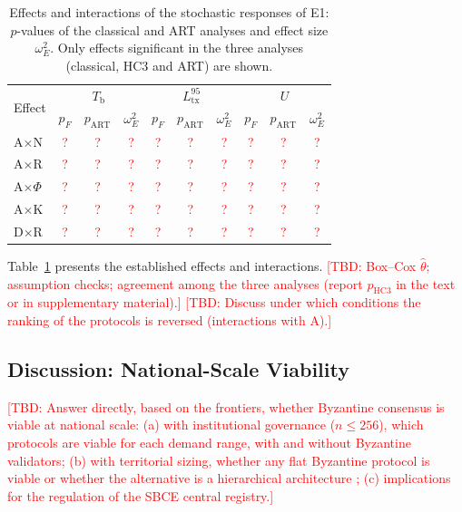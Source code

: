 \documentclass[english]{sbc2025}%
\newcommand{\tbd}[1]{\textcolor{red}{[TBD: #1]}}
\newcommand{\Tb}{T_{\mathrm{b}}}
\newcommand{\Lt}{L^{95}_{\mathrm{tx}}}
\newcommand{\Ut}{U}
\newcommand{\tbdc}{\textcolor{red}{?}} %
\begin{document}
\begin{table}[!ht]
\caption{Effects and interactions of the stochastic responses of E1: $p$-values of the classical and ART analyses and effect size $\omega^{2}_{E}$. Only effects significant in the three analyses (classical, HC3 and ART) are shown.}
\label{tab:anova}
\centering
\small
\begin{tabular}{@{}lccccccccc@{}}
\hline\hline
\multirow{2}{*}{Effect} & \multicolumn{3}{c}{$\Tb$} & \multicolumn{3}{c}{$\Lt$} & \multicolumn{3}{c}{$\Ut$} \\
 & $p_{F}$ & $p_{\mathrm{ART}}$ & $\omega^{2}_{E}$ & $p_{F}$ & $p_{\mathrm{ART}}$ & $\omega^{2}_{E}$ & $p_{F}$ & $p_{\mathrm{ART}}$ & $\omega^{2}_{E}$ \\
\hline
A$\times$N        & \tbdc & \tbdc & \tbdc & \tbdc & \tbdc & \tbdc & \tbdc & \tbdc & \tbdc \\
A$\times$R        & \tbdc & \tbdc & \tbdc & \tbdc & \tbdc & \tbdc & \tbdc & \tbdc & \tbdc \\
A$\times\Phi$     & \tbdc & \tbdc & \tbdc & \tbdc & \tbdc & \tbdc & \tbdc & \tbdc & \tbdc \\
A$\times$K        & \tbdc & \tbdc & \tbdc & \tbdc & \tbdc & \tbdc & \tbdc & \tbdc & \tbdc \\
D$\times$R        & \tbdc & \tbdc & \tbdc & \tbdc & \tbdc & \tbdc & \tbdc & \tbdc & \tbdc \\
\hline\hline
\end{tabular}
\end{table}

Table~\ref{tab:anova} presents the established effects and interactions. \tbd{Box--Cox $\hat\theta$; assumption checks; agreement among the three analyses (report $p_{\mathrm{HC3}}$ in the text or in supplementary material).} \tbd{Discuss under which conditions the ranking of the protocols is reversed (interactions with A).}

\subsection{Discussion: National-Scale Viability}

\tbd{Answer directly, based on the frontiers, whether Byzantine consensus is viable at national scale: (a) with institutional governance ($n \le 256$), which protocols are viable for each demand range, with and without Byzantine validators; (b) with territorial sizing, whether any flat Byzantine protocol is viable or whether the alternative is a hierarchical architecture \citep{Amir2010}; (c) implications for the regulation of the SBCE central registry.}
\end{document}
